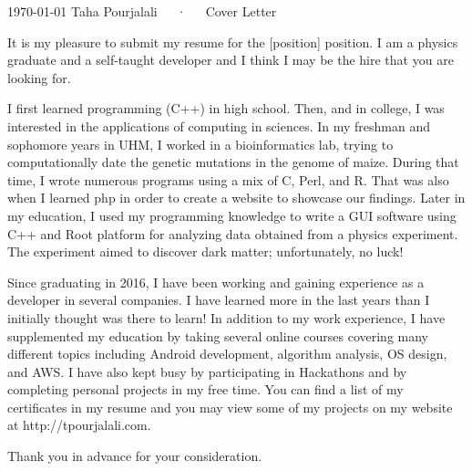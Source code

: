 \documentclass[11pt, a4paper]{awesome-cv}
\begin{document}
\makecvheader

\makecvfooter
  {\today}
  {Taha Pourjalali~~~·~~~Cover Letter}
  {}

\makelettertitle

\begin{cvletter}



It is my pleasure to submit my resume for the [position] position. I am a physics graduate and a self-taught developer and I think I may be the hire that you are looking for.  

I first learned programming (C++) in high school.  Then, and in college, I was interested in the applications of computing in sciences.  In my freshman and sophomore years in UHM, I worked in a bioinformatics lab, trying to computationally date the genetic mutations in the genome of maize. During that time, I wrote numerous programs using a mix of C, Perl, and R.  That was also when I learned php in order to create a website to showcase our findings.  
Later in my education, I used my programming knowledge to write a GUI software using C++ and Root platform for analyzing data obtained from a physics experiment.  The experiment aimed to discover dark matter; unfortunately, no luck!

Since graduating in 2016, I have been working and gaining experience as a developer in several companies.  I have learned more in the last years than I initially thought was there to learn! In addition to my work experience, I have supplemented my education by taking several online courses covering many different topics including Android development, algorithm analysis, OS design, and AWS. I have also kept busy by participating in Hackathons and by completing personal projects in my free time. You can find a list of my certificates in my resume and you may view some of my projects on my website at http://tpourjalali.com.


Thank you in advance for your consideration.




\end{cvletter}
\end{document}

